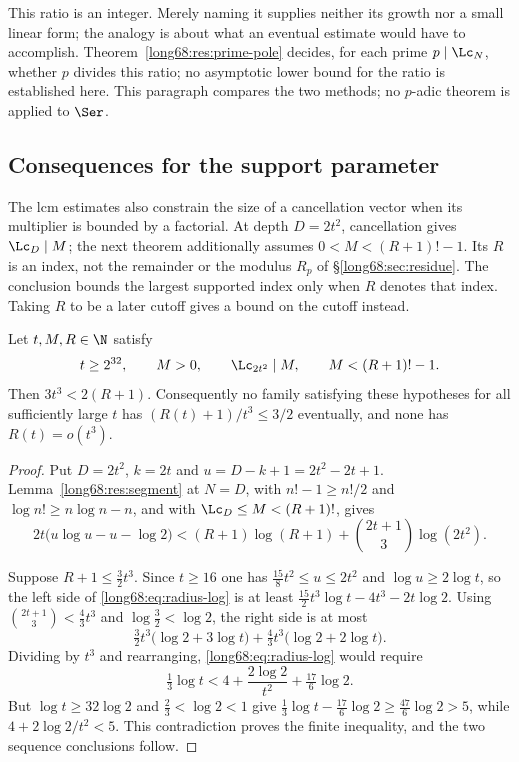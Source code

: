 This ratio is an integer.  Merely naming it supplies neither its growth
nor a small linear form; the analogy is about what an eventual estimate
would have to accomplish.
Theorem~\ref{long68:res:prime-pole} decides, for each prime $p\mid\Lc_N$,
whether $p$ divides this ratio; no asymptotic lower bound for the ratio is
established here.  This paragraph compares the two methods; no $p$-adic
theorem is applied to $\Ser$.

\subsection{Consequences for the support parameter}\label{long68:sec:quantitative-support}

The lcm estimates also constrain the size of a cancellation vector
when its multiplier is bounded by a factorial. At depth $D=2t^2$,
cancellation gives $\Lc_D\mid M$; the next theorem additionally assumes
$0<M<(R+1)!-1$. Its $R$ is an index, not the remainder or the modulus
$R_p$ of \S\ref{long68:sec:residue}. The conclusion bounds the largest
supported index only when $R$ denotes that index. Taking $R$ to be a
later cutoff gives a bound on the cutoff instead.

\begin{samepage}
\label{long68:res:lead-channel-radius}
\begin{theorem}\label{long68:res:channel-radius}
Let $t,M,R\in\N$ satisfy
\[
 t\ge2^{32},\qquad M>0,\qquad \Lc_{2t^2}\mid M,\qquad M<(R+1)!-1 .
\]
Then $3t^3<2(R+1)$.  Consequently no family satisfying these hypotheses for
all sufficiently large $t$ has $(R(t)+1)/t^3\le3/2$ eventually, and none has
$R(t)=o(t^3)$.

\end{theorem}
\end{samepage}

\begin{proof}
Put $D=2t^2$, $k=2t$ and $u=D-k+1=2t^2-2t+1$.  Lemma~\ref{long68:res:segment} at
$N=D$, with $n!-1\ge n!/2$ and $\log n!\ge n\log n-n$, and with
$\Lc_D\le M<(R+1)!$, gives
\begin{equation}\label{long68:eq:radius-log}
 2t\bigl(u\log u-u-\log2\bigr)
 <(R+1)\log(R+1)+\binom{2t+1}{3}\log(2t^2).
\end{equation}


Suppose $R+1\le\tfrac32t^3$.  Since $t\ge16$ one has
$\tfrac{15}{8}t^2\le u\le2t^2$ and $\log u\ge2\log t$, so the left side of
\eqref{long68:eq:radius-log} is at least
$\tfrac{15}{2}t^3\log t-4t^3-2t\log2$.  Using
$\binom{2t+1}{3}<\tfrac43t^3$ and $\log\tfrac32<\log2$, the right side is at
most
\[
 \tfrac32t^3\bigl(\log2+3\log t\bigr)+\tfrac43t^3\bigl(\log2+2\log t\bigr).
\]
Dividing by $t^3$ and rearranging, \eqref{long68:eq:radius-log} would require
\[
 \tfrac13\log t<4+\frac{2\log2}{t^2}+\tfrac{17}6\log2 .
\]
But $\log t\ge32\log2$ and $\tfrac23<\log2<1$ give
$\tfrac13\log t-\tfrac{17}6\log2\ge\tfrac{47}6\log2>5$, while
$4+2\log2/t^2<5$.  This contradiction proves the finite inequality, and the
two sequence conclusions follow.
\end{proof}

